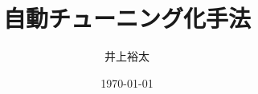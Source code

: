 \documentclass[a4j,12pt,onecolumn]{ujarticle} %
\title{ 自動チューニング化手法 }
\author{井上裕太}
\date{\today}
\begin{document}
\maketitle %


\tableofcontents
\listoffigures
\listoftables

% 






\medskip


\end{document}
